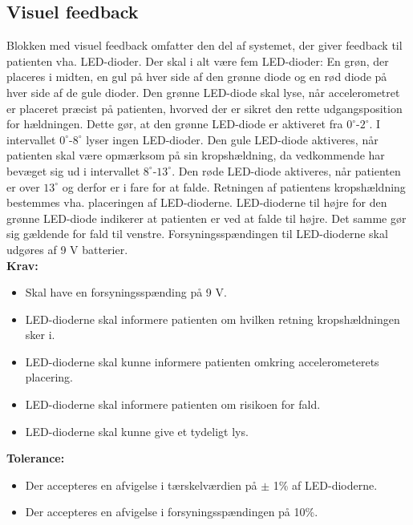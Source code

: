 \subsection{Visuel feedback}
Blokken med visuel feedback omfatter den del af systemet, der giver feedback til patienten vha. LED-dioder. Der skal i alt være fem LED-dioder: En grøn, der placeres i midten, en gul på hver side af den grønne diode og en rød diode på hver side af de gule dioder. Den grønne LED-diode skal lyse, når accelerometret er placeret præcist på patienten, hvorved der er sikret den rette udgangsposition for hældningen. Dette gør, at den grønne LED-diode er aktiveret fra $0^{\circ}$-$2^{\circ}$. I intervallet $0^{\circ}$-$8^{\circ}$ lyser ingen LED-dioder. Den gule LED-diode aktiveres, når patienten skal være opmærksom på sin kropshældning, da vedkommende har bevæget sig ud i intervallet $8^{\circ}$-$13^{\circ}$. Den røde LED-diode aktiveres, når patienten er over $13^{\circ}$ og derfor er i fare for at falde. Retningen af patientens kropshældning bestemmes vha. placeringen af LED-dioderne. LED-dioderne til højre for den grønne LED-diode indikerer at patienten er ved at falde til højre. Det samme gør sig gældende for fald til venstre. Forsyningsspændingen til LED-dioderne skal udgøres af 9 V batterier.   
\\
\textbf{Krav:}
\begin{itemize}
	\item Skal have en forsyningsspænding på 9 V.
	\item LED-dioderne skal informere patienten om hvilken retning kropshældningen sker i.
	\item LED-dioderne skal kunne informere patienten omkring accelerometerets placering.
	\item LED-dioderne skal informere patienten om risikoen for fald.
	\item LED-dioderne skal kunne give et tydeligt lys.
\end{itemize}
\textbf{Tolerance:}
\begin{itemize}
	\item Der accepteres en afvigelse i tærskelværdien på $\pm$ 1\% af LED-dioderne.
	\item Der accepteres en afvigelse i forsyningsspændingen på 10\%.
\end{itemize}
